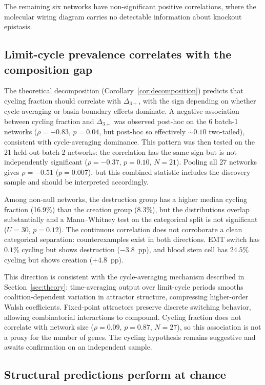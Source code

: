 \documentclass[10pt]{article}
\begin{document}
The remaining six networks have non-significant positive
correlations, where the molecular wiring diagram carries no detectable
information about knockout epistasis.


\subsection{Limit-cycle prevalence correlates with the composition gap}
\label{sec:cycling}

The theoretical decomposition (Corollary~\ref{cor:decomposition})
predicts that cycling fraction should correlate with $\Delta_{3+}$,
with the sign depending on whether cycle-averaging or basin-boundary
effects dominate. A negative association between cycling fraction and $\Delta_{3+}$ was
observed post-hoc on the 6 batch-1 networks ($\rho = -0.83$,
$p = 0.04$, but post-hoc so effectively $\sim 0.10$ two-tailed),
consistent with cycle-averaging dominance.
This pattern was then tested on the 21 held-out batch-2 networks:
the correlation has the same sign but is not independently
significant ($\rho = -0.37$, $p = 0.10$, $N = 21$). Pooling all 27
networks gives $\rho = -0.51$ ($p = 0.007$), but this combined
statistic includes the discovery sample and should be interpreted
accordingly.

Among non-null networks, the destruction group has a higher median
cycling fraction (16.9\%) than the creation group (8.3\%), but the
distributions overlap substantially and a Mann--Whitney test on the
categorical split is not significant ($U = 30$, $p = 0.12$). The
continuous correlation does not corroborate a clean categorical
separation: counterexamples exist in both directions. EMT switch has
$0.1\%$ cycling but shows destruction ($-3.8$~pp), and blood stem
cell has $24.5\%$ cycling but shows creation ($+4.8$~pp).

This direction is consistent with the cycle-averaging mechanism
described in Section~\ref{sec:theory}: time-averaging output over
limit-cycle periods smooths coalition-dependent variation in attractor
structure, compressing higher-order Walsh coefficients. Fixed-point
attractors preserve discrete switching behavior, allowing
combinatorial interactions to compound. Cycling fraction does not
correlate with network size ($\rho = 0.09$, $p = 0.87$, $N = 27$),
so this association is not a proxy for the number of genes. The
cycling hypothesis remains suggestive and awaits confirmation on an
independent sample.


\subsection{Structural predictions perform at chance}
\label{sec:blind-results}
\end{document}
